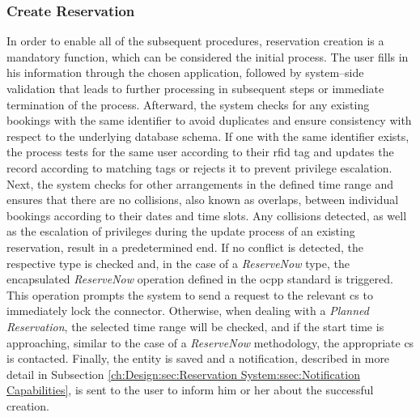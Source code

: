 \subsubsection{Create Reservation}
\label{ch:Design:sec:Reservation System:ssec:Management Capabilities:sssec:Create Reservation}

In order to enable all of the subsequent procedures, reservation creation is a mandatory function, which can be considered the initial process. The user fills in his information through the chosen application, followed by system--side validation that leads to further processing in subsequent steps or immediate termination of the process.
Afterward, the system checks for any existing bookings with the same identifier to avoid duplicates and ensure consistency with respect to the underlying database schema. If one with the same identifier exists, the process tests for the same user according to their \acrshort{rfid} tag and updates the record according to matching tags or rejects it to prevent privilege escalation.
Next, the system checks for other arrangements in the defined time range and ensures that there are no collisions, also known as overlaps, between individual bookings according to their dates and time slots.
Any collisions detected, as well as the escalation of privileges during the update process of an existing reservation, result in a predetermined end.
If no conflict is detected, the respective type is checked and, in the case of a \textit{ReserveNow} type, the encapsulated \textit{ReserveNow} operation defined in the \acrshort{ocpp} standard \cite{noauthor_ocpp_nodate} is triggered. This operation prompts the system to send a request to the relevant \acrshort{cs} to immediately lock the connector. 
Otherwise, when dealing with a \textit{Planned Reservation}, the selected time range will be checked, and if the start time is approaching, similar to the case of a \textit{ReserveNow} methodology, the appropriate \acrshort{cs} is contacted.
Finally, the entity is saved and a notification, described in more detail in Subsection \ref{ch:Design:sec:Reservation System:ssec:Notification Capabilities}, is sent to the user to inform him or her about the successful creation.

